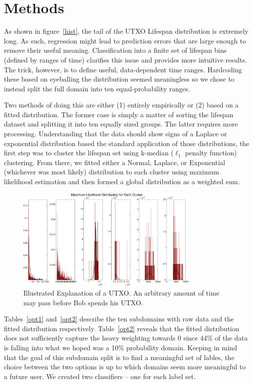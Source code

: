 \documentclass[11pt]{article}
\begin{document}
\section{Methods}
As shown in figure~\ref{hist}, the tail of the UTXO Lifespan distribution is extremely long. As such, regression might lead to prediction errors that are large enough to remove their useful meaning. Classification into a finite set of lifespan bins (defined by ranges of time) clarifies this issue and provides more intuitive results. The trick, however, is to define useful, data-dependent time ranges. Hardcoding these based on eyeballing the distribution seemed meaningless so we chose to instead split the full domain into ten equal-probability ranges.

Two methods of doing this are either (1) entirely empirically or (2) based on a fitted distribution. The former case is simply a matter of sorting the lifespan dataset and splitting it into ten equally sized groups. The latter requires more processing. Understanding that the data should show signs of a Laplace or exponential distribution based the standard application of those distributions, the first step was to cluster the lifespan set using k-median ($\ell_1$ penalty function) clustering. From there, we fitted either a Normal, Laplace, or Exponential (whichever was most likely) distribution to each cluster using maximum likelihood estimation and then formed a global distribution as a weighted sum. 

\begin{figure}
\begin{center}
\includegraphics[width=0.8\textwidth]{figures/fits}
\end{center}
\caption{Illustrated Explanation of a UTXO. An arbitrary amount of time may pass before Bob spends his UTXO.}
\label{fits}
\end{figure}

Tables~\ref{opt1} and~\ref{opt2} describe the ten subdomains with raw data and the fitted distribution respectively. Table~\ref{opt2} reveals that the fitted distribution does not sufficiently capture the heavy weighting towards 0 since 44\% of the data is falling into what we hoped was a 10\% probability domain. Keeping in mind that the goal of this subdomain split is to find a meaningful set of lables, the choice between the two options is up to which domains seem more meaningful to a future user. We created two classifiers -- one for each label set.
\end{document}
